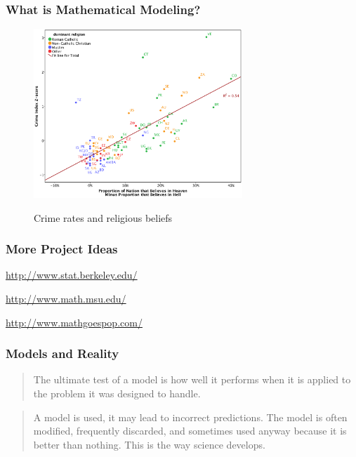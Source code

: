 \documentclass[hyperref={colorlinks=false},compress,handout,10pt]{beamer}
\begin{document}
\begin{frame}[fragile]
    \frametitle{What is Mathematical Modeling?}
        \begin{figure}
            \centering
            \caption{Crime rates and religious beliefs}
            \href{http://www.economist.com/blogs/graphicdetail/2012/09/daily-chart}{
            \includegraphics[width=0.7\textwidth]{images/hellvsheaven.png}}
    \end{figure}
\end{frame}

\begin{frame}[fragile]
    \frametitle{More Project Ideas}
    \begin{center}
    \href{http://www.stat.berkeley.edu/users/statlabs/}{http://www.stat.berkeley.edu/}
    \end{center}
    \vskip0.3in
    \begin{center}
        \href{http://www.math.msu.edu/Academic%5FPrograms/graduate/msim//ProjectPage.aspx}{http://www.math.msu.edu/}
    \end{center}
    \vskip0.3in
    \begin{center}
        \href{http://www.mathgoespop.com/2011/09/moneyball.html}{http://www.mathgoespop.com/}
    \end{center}
\end{frame}

\begin{frame}
    \frametitle{Models and Reality}
    \begin{verse}
        The ultimate test of a model is how well it performs when 
        it is applied to the problem it was designed to handle.
    \end{verse}
    \vskip0.5in
    \begin{verse}
       A model is used, it may lead to incorrect predictions. The model is
       often modified, frequently discarded, and sometimes used anyway because
       it is better than nothing. This is the way science develops.  
    \end{verse}
\end{frame}
\end{document}
